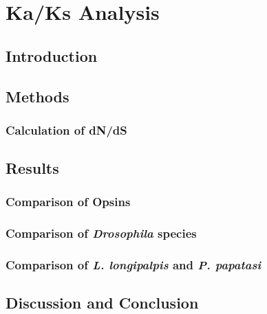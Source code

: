 \section{Ka/Ks Analysis}

\subsection{Introduction}

\subsection{Methods}

\subsubsection{Calculation of dN/dS}

\subsection{Results}

\subsubsection{Comparison of Opsins}

\subsubsection{Comparison of \emph{Drosophila} species}

\subsubsection{Comparison of \emph{L. longipalpis} and \emph{P. papatasi}}

\subsection{Discussion and Conclusion}